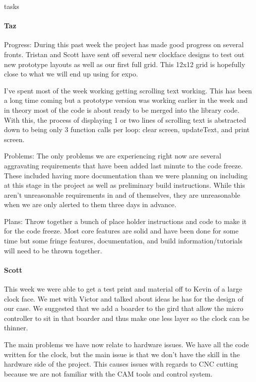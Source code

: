 tasks\documentclass[onecolumn, draftclsnofoot,10pt, compsoc]{IEEEtran}
\begin{document}
\paragraph{Taz}
Progress: During this past week the project has made good progress on several fronts. Tristan and Scott have sent off several new clockface designs to test out new prototype layouts as well as our first full grid. This 12x12 grid is hopefully close to what we will end up using for expo.

I've spent most of the week working getting scrolling text working. This has been a long time coming but a prototype version was working earlier in the week and in theory most of the code is about ready to be merged into the library code. With this, the process of displaying 1 or two lines of scrolling text is abstracted down to being only 3 function calls per loop: clear screen, updateText, and print screen.

Problems: The only problems we are experiencing right now are several aggravating requirements that have been added last minute to the code freeze. These included having more documentation than we were planning on including at this stage in the project as well as preliminary build instructions. While this aren't unreasonable requirements in and of themselves, they are unreasonable when we are only alerted to them three days in advance.

Plans: Throw together a bunch of place holder instructions and code to make it for the code freeze. Most core features are solid and have been done for some time but some fringe features, documentation, and build information/tutorials will need to be thrown together.
\paragraph{Scott}
This week we were able to get a test print and material off to Kevin of a large clock face. We met with Victor and talked about ideas he has for the design of our case. We suggested that we add a boarder to the gird that allow the micro controller to sit in that boarder and thus make one less layer so the clock can be thinner.

The main problems we have now relate to hardware issues. We have all the code written for the clock, but the main issue is that we don't have the skill in the hardware side of the project. This causes issues with regards to CNC cutting because we are not familiar with the CAM tools and control system.
\end{document}
